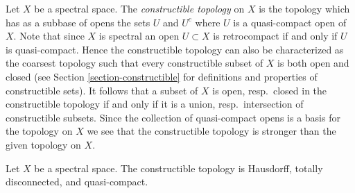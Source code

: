 \medskip\noindent
Let $X$ be a spectral space. The {\it constructible topology} on $X$
is the topology which has as a subbase of opens the sets $U$ and $U^c$
where $U$ is a quasi-compact open of $X$. Note that since $X$ is spectral
an open $U \subset X$ is retrocompact if and only if $U$ is quasi-compact.
Hence the constructible topology can also be characterized as the coarsest
topology such that every constructible subset of $X$ is both open and closed
(see Section \ref{section-constructible} for definitions and properties of
constructible sets).
It follows that a subset of $X$ is open, resp.\ closed in the constructible
topology if and only if it is a union, resp.\ intersection of constructible
subsets. Since the collection of quasi-compact opens is a basis for the topology
on $X$ we see that the constructible topology is stronger than the
given topology on $X$.

\begin{lemma}
\label{lemma-constructible-hausdorff-quasi-compact}
Let $X$ be a spectral space. The constructible topology is
Hausdorff, totally disconnected, and quasi-compact.
\end{lemma}

